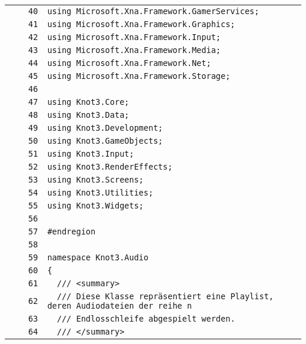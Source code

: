 \documentclass[a4paper,10pt]{article}
\begin{document}
\begin{longtable}[l]{lrrl}
\cellcolor{gray} &  & \verb~40~ & \verb~using Microsoft.Xna.Framework.GamerServices;~\\
\cellcolor{gray} &  & \verb~41~ & \verb~using Microsoft.Xna.Framework.Graphics;~\\
\cellcolor{gray} &  & \verb~42~ & \verb~using Microsoft.Xna.Framework.Input;~\\
\cellcolor{gray} &  & \verb~43~ & \verb~using Microsoft.Xna.Framework.Media;~\\
\cellcolor{gray} &  & \verb~44~ & \verb~using Microsoft.Xna.Framework.Net;~\\
\cellcolor{gray} &  & \verb~45~ & \verb~using Microsoft.Xna.Framework.Storage;~\\
\cellcolor{gray} &  & \verb~46~ & \verb~~\\
\cellcolor{gray} &  & \verb~47~ & \verb~using Knot3.Core;~\\
\cellcolor{gray} &  & \verb~48~ & \verb~using Knot3.Data;~\\
\cellcolor{gray} &  & \verb~49~ & \verb~using Knot3.Development;~\\
\cellcolor{gray} &  & \verb~50~ & \verb~using Knot3.GameObjects;~\\
\cellcolor{gray} &  & \verb~51~ & \verb~using Knot3.Input;~\\
\cellcolor{gray} &  & \verb~52~ & \verb~using Knot3.RenderEffects;~\\
\cellcolor{gray} &  & \verb~53~ & \verb~using Knot3.Screens;~\\
\cellcolor{gray} &  & \verb~54~ & \verb~using Knot3.Utilities;~\\
\cellcolor{gray} &  & \verb~55~ & \verb~using Knot3.Widgets;~\\
\cellcolor{gray} &  & \verb~56~ & \verb~~\\
\cellcolor{gray} &  & \verb~57~ & \verb~#endregion~\\
\cellcolor{gray} &  & \verb~58~ & \verb~~\\
\cellcolor{gray} &  & \verb~59~ & \verb~namespace Knot3.Audio~\\
\cellcolor{gray} &  & \verb~60~ & \verb~{~\\
\cellcolor{gray} &  & \verb~61~ & \verb~  /// <summary>~\\
\cellcolor{gray} &  & \verb~62~ & \verb~  /// Diese Klasse repräsentiert eine Playlist, deren Audiodateien der reihe n~\\
\cellcolor{gray} &  & \verb~63~ & \verb~  /// Endlosschleife abgespielt werden.~\\
\cellcolor{gray} &  & \verb~64~ & \verb~  /// </summary>~\\

\end{longtable}
\end{document}
